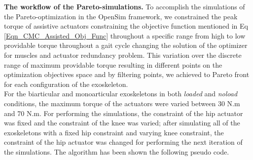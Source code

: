 \documentclass[10pt,letterpaper]{article}
\begin{document}
\textbf{The workflow of the Pareto-simulations.} To accomplish the simulations of the Pareto-optimization in the OpenSim framework, we constrained the peak torque of assistive actuators constraining the objective function mentioned in Eq \ref{Eqn_CMC_Assisted_Obj_Func} throughout a specific range from high to low providable torque throughout a gait cycle changing the solution of the optimizer for muscles and actuator redundancy problem. This variation over the discrete range of maximum providable torque resulting in different points on the optimization objectives space and by filtering points, we achieved to Pareto front for each configuration of the exoskeleton.\\
For the biarticular and monoarticular exoskeletons in both \textit{loaded} and \textit{noload} conditions, the maximum torque of the actuators were varied between 30 N.m and 70 N.m. For performing the simulations, the constraint of the hip actuator was fixed and the constraint of the knee was varied; after simulating all of the exoskeletons with a fixed hip constraint and varying knee constraint, the constraint of the hip actuator was changed for performing the next iteration of the simulations. The algorithm has been shown the following pseudo code.\\
\end{document}
